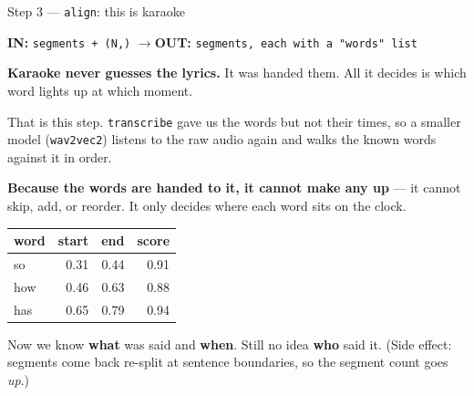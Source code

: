 \documentclass[aspectratio=169]{beamer}
\newcommand{\shapebox}[2]{%
  \begin{center}
  \colorbox{black!8}{\parbox{0.9\textwidth}{\centering
  \textbf{IN:} \texttt{#1} \qquad$\longrightarrow$\qquad \textbf{OUT:} \texttt{#2}}}
  \end{center}}
\begin{document}
\begin{frame}{Step 3 --- \texttt{align}: this is karaoke}

\shapebox{segments + (N,)}{segments, each with a "words" list}

\textbf{Karaoke never guesses the lyrics.} It was handed them. All it decides is which word
lights up at which moment.

\vspace{0.5em}
That is this step. \texttt{transcribe} gave us the words but not their times, so a smaller
model (\texttt{wav2vec2}) listens to the raw audio again and walks the known words against
it in order.

\vspace{0.4em}
\textbf{Because the words are handed to it, it cannot make any up} --- it cannot skip, add,
or reorder. It only decides where each word sits on the clock.

\begin{center}
\scriptsize
\begin{tabular}{lrrr}
\toprule
\textbf{word} & \textbf{start} & \textbf{end} & \textbf{score} \\
\midrule
so & 0.31 & 0.44 & 0.91 \\
how & 0.46 & 0.63 & 0.88 \\
has & 0.65 & 0.79 & 0.94 \\
\bottomrule
\end{tabular}
\end{center}

\vspace{0.2em}
Now we know \textbf{what} was said and \textbf{when}. Still no idea \textbf{who} said it.
{\small (Side effect: segments come back re-split at sentence boundaries, so the segment
count goes \emph{up}.)}

\end{frame}
\end{document}
